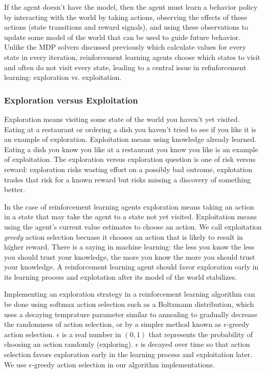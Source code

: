 If the agent doesn't have the model, then the agent must learn a behavior policy by interacting with the world by taking actions, observing the effects of these actions (state transitions and reward signals), and using these observations to update some model of the world that can be used to guide future behavior. Unlike the MDP solvers discussed previously which calculate values for every state in every iteration, reinforcement learning agents choose which states to visit and often do not visit every state, leading to a central issue in refinforcement learning: exploration vs. exploitation.

\subsubsection{Exploration versus Exploitation}

Exploration means visiting some state of the world you haven't yet visited. Eating at a restaurant or ordering a dish you haven't tried to see if you like it is an example of exploration. Exploitation means using knowledge already learned. Eating a dish you know you like at a restaurant you know you like is an example of exploitation. The exploration versus exploration question is one of risk versus reward: exploration risks wasting effort on a possibly bad outcome, explotation trades that risk for a known reward but risks missing a discovery of something better.

In the case of reinforcement learning agents exploration means taking an action in a state that may take the agent to a state not yet visited. Exploitation means using the agent's current value estimates to choose an action. We call exploitation {\it greedy} action selection becuase it chooses an action that is likely to result in higher reward. There is a saying in machine learning: the less you know the less you should trust your knowledge, the more you know the more you should trust your knowledge. A reinforcement learning agent should favor exploration early in its learning process and explotation after its model of the world stabilizes.

Implementing an exploration strategy in a reinforcement learning algorithm can be done using softmax action selection such as a Boltzmann distribution, which uses a decaying temprature parameter similar to annealing to gradually decrease the randomness of action selection, or by a simpler method known as $\epsilon$-greedy action selection.  $\epsilon$ is a real number in $(0, 1)$ that represents the probability of choosing an action randomly (exploring). $\epsilon$ is decayed over time so that action selection favors exploration early in the learning process and exploitation later. We use $\epsilon$-greedy action selection in our algorithm implementations.

